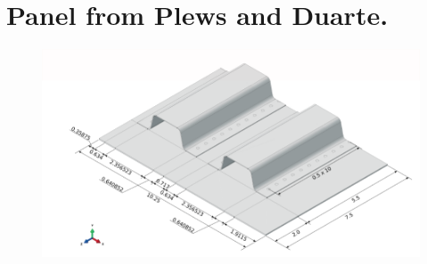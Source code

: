\documentclass[a4paper, 12pt]{article}
\begin{document}
\newpage
\appendix
\section{Panel from Plews and Duarte.}\label{app:big_image}

\begin{figure}[H]
  \centering
  \includegraphics[width=1.1\textwidth]{plews_panel}
\end{figure}
\end{document}
